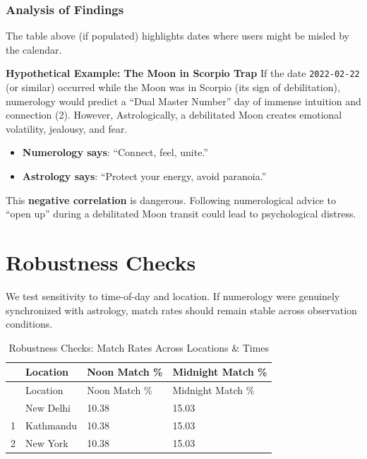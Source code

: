 \documentclass[
  11pt,
  a4paper,
  oneside,
  openany]{article}
\providecommand{\tightlist}{%
  \setlength{\itemsep}{0pt}\setlength{\parskip}{0pt}}\usepackage{longtable,booktabs,array}
\begin{document}
\subsubsection{Analysis of Findings}\label{analysis-of-findings}

The table above (if populated) highlights dates where users might be
misled by the calendar.

\textbf{Hypothetical Example: The Moon in Scorpio Trap} If the date
\texttt{2022-02-22} (or similar) occurred while the Moon was in Scorpio
(its sign of debilitation), numerology would predict a ``Dual Master
Number'' day of immense intuition and connection (2). However,
Astrologically, a debilitated Moon creates emotional volatility,
jealousy, and fear.

\begin{itemize}
\tightlist
\item
  \textbf{Numerology says}: ``Connect, feel, unite.''
\item
  \textbf{Astrology says}: ``Protect your energy, avoid paranoia.''
\end{itemize}

This \textbf{negative correlation} is dangerous. Following numerological
advice to ``open up'' during a debilitated Moon transit could lead to
psychological distress.

\section{Robustness Checks}\label{robustness-checks}

We test sensitivity to time-of-day and location. If numerology were
genuinely synchronized with astrology, match rates should remain stable
across observation conditions.

\label{robustness}
\begin{longtable}[]{@{}llll@{}}
\caption{Robustness Checks: Match Rates Across Locations \&
Times}\tabularnewline
\toprule\noalign{}
& Location & Noon Match \% & Midnight Match \% \\
\midrule\noalign{}
\endfirsthead
\toprule\noalign{}
& Location & Noon Match \% & Midnight Match \% \\
\midrule\noalign{}
\endhead
\bottomrule\noalign{}
\endlastfoot
0 & New Delhi & 10.38 & 15.03 \\
1 & Kathmandu & 10.38 & 15.03 \\
2 & New York & 10.38 & 15.03 \\
\end{longtable}
\end{document}
